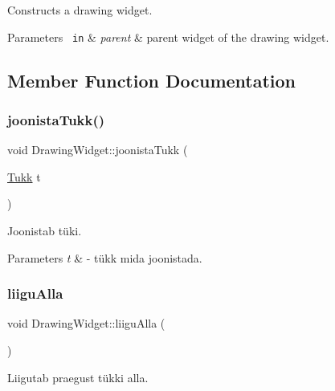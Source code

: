 Constructs a drawing widget. 
\begin{DoxyParams}[1]{Parameters}
\mbox{\texttt{ in}}  & {\em parent} & parent widget of the drawing widget. \\
\hline
\end{DoxyParams}


\subsection{Member Function Documentation}
\mbox{\label{class_drawing_widget_ae6574fd0fa1a0a5b89ad5e960dcebb3a}} 
\subsubsection{\texorpdfstring{joonistaTukk()}{joonistaTukk()}}
{\footnotesize\ttfamily void Drawing\+Widget\+::joonista\+Tukk (\begin{DoxyParamCaption}\item[{\mbox{\hyperlink{class_tukk}{Tukk}}}]{t }\end{DoxyParamCaption})\hspace{0.3cm}{\ttfamily [protected]}}

Joonistab tüki. 
\begin{DoxyParams}{Parameters}
{\em t} & -\/ tükk mida joonistada. \\
\hline
\end{DoxyParams}
\mbox{\label{class_drawing_widget_a55410c521353a1b11424d7eb7e482482}} 
\subsubsection{\texorpdfstring{liiguAlla}{liiguAlla}}
{\footnotesize\ttfamily void Drawing\+Widget\+::liigu\+Alla (\begin{DoxyParamCaption}{ }\end{DoxyParamCaption})\hspace{0.3cm}{\ttfamily [slot]}}

Liigutab praegust tükki alla. \mbox{\label{class_drawing_widget_a77322953487457dd5295914ad7607ca1}} 
